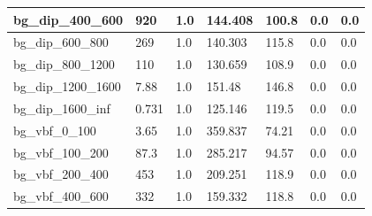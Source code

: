 \documentclass[a4paper, 10pt]{article}
\begin{document}
\begin{table}[H]
\begin{center}
\begin{tabular}{|m{23.0mm}|m{23.0mm}|m{18.0mm}|m{19.0mm}|m{19.0mm}|m{19.0mm}|m{19.0mm}|}
      \hline
      {\cellcolor{white}         bg\_dip\_400\_600}& {\cellcolor{white}         920}& {\cellcolor{white}         1.0}& {\cellcolor{white}         144.408}& {\cellcolor{white}         100.8}& {\cellcolor{green}         0.0}& {\cellcolor{green}         0.0}\\
      \hline
      {\cellcolor{white}         bg\_dip\_600\_800}& {\cellcolor{white}         269}& {\cellcolor{white}         1.0}& {\cellcolor{white}         140.303}& {\cellcolor{white}         115.8}& {\cellcolor{green}         0.0}& {\cellcolor{green}         0.0}\\
      \hline
      {\cellcolor{white}         bg\_dip\_800\_1200}& {\cellcolor{white}         110}& {\cellcolor{white}         1.0}& {\cellcolor{white}         130.659}& {\cellcolor{white}         108.9}& {\cellcolor{green}         0.0}& {\cellcolor{green}         0.0}\\
      \hline
      {\cellcolor{white}         bg\_dip\_1200\_1600}& {\cellcolor{white}         7.88}& {\cellcolor{white}         1.0}& {\cellcolor{white}         151.48}& {\cellcolor{white}         146.8}& {\cellcolor{green}         0.0}& {\cellcolor{green}         0.0}\\
      \hline
      {\cellcolor{white}         bg\_dip\_1600\_inf}& {\cellcolor{white}         0.731}& {\cellcolor{white}         1.0}& {\cellcolor{white}         125.146}& {\cellcolor{white}         119.5}& {\cellcolor{green}         0.0}& {\cellcolor{green}         0.0}\\
      \hline
      {\cellcolor{white}         bg\_vbf\_0\_100}& {\cellcolor{white}         3.65}& {\cellcolor{white}         1.0}& {\cellcolor{white}         359.837}& {\cellcolor{white}         74.21}& {\cellcolor{green}         0.0}& {\cellcolor{green}         0.0}\\
      \hline
      {\cellcolor{white}         bg\_vbf\_100\_200}& {\cellcolor{white}         87.3}& {\cellcolor{white}         1.0}& {\cellcolor{white}         285.217}& {\cellcolor{white}         94.57}& {\cellcolor{green}         0.0}& {\cellcolor{green}         0.0}\\
      \hline
      {\cellcolor{white}         bg\_vbf\_200\_400}& {\cellcolor{white}         453}& {\cellcolor{white}         1.0}& {\cellcolor{white}         209.251}& {\cellcolor{white}         118.9}& {\cellcolor{green}         0.0}& {\cellcolor{green}         0.0}\\
      \hline
      {\cellcolor{white}         bg\_vbf\_400\_600}& {\cellcolor{white}         332}& {\cellcolor{white}         1.0}& {\cellcolor{white}         159.332}& {\cellcolor{white}         118.8}& {\cellcolor{green}         0.0}& {\cellcolor{green}         0.0}\\

\end{tabular}
\end{center}
\end{table}
\end{document}

